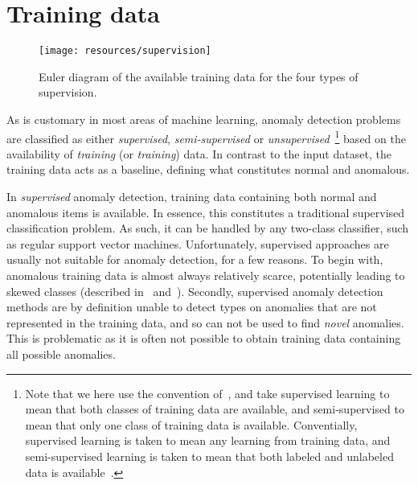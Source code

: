 \section{Training data}
\label{sect:training_data}

\begin{wrapfigure}{r}{0.5\textwidth}
    \vspace{-25pt}
    \begin{center}
        \leavevmode
        \texttt{[image: resources/supervision]}
    \end{center}
    \caption{{\small Euler diagram of the available training data for the four types of supervision.}}
\label{fig:supervision}
    \vspace{-40pt}
\end{wrapfigure}

As is customary in most areas of machine learning, anomaly detection problems are classified as either \emph{supervised}, \emph{semi-supervised} or \emph{unsupervised}~\footnote{Note that we here use the convention of~\cite{chandola}, and take supervised learning to mean that both classes of training data are available, and semi-supervised to mean that only one class of training data is available. Conventially, supervised learning is taken to mean any learning from training data, and semi-supervised learning is taken to mean that both labeled and unlabeled data is available~\cite{TODO}.} based on the availability of \emph{training} (or \emph{training}) data. In contrast to the input dataset, the training data acts as a baseline, defining what constitutes normal and anomalous.

In \emph{supervised} anomaly detection, training data containing both normal and anomalous items is available. In essence, this constitutes a traditional supervised classification problem. As such, it can be handled by any two-class classifier, such as regular support vector machines. Unfortunately, supervised approaches are usually not suitable for anomaly detection, for a few reasons. To begin with, anomalous training data is almost always relatively scarce, potentially leading to skewed classes (described in~\cite{phua} and~\cite{joshi}). Secondly, supervised anomaly detection methods are by definition unable to detect types on anomalies that are not represented in the training data, and so can not be used to find \emph{novel} anomalies. This is problematic as it is often not possible to obtain training data containing all possible anomalies.

